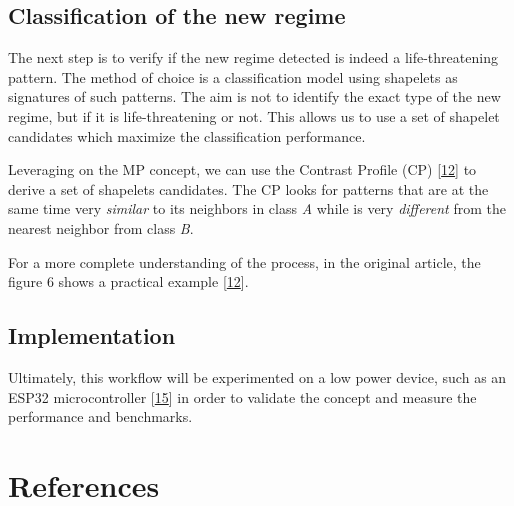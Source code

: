\documentclass[runningheads]{llncs}
\begin{document}
\hypertarget{classification-of-the-new-regime}{%
\subsection{Classification of the new regime}\label{classification-of-the-new-regime}}

The next step is to verify if the new regime detected is indeed a life-threatening pattern. The
method of choice is a classification model using shapelets as signatures of such patterns. The aim is
not to identify the exact type of the new regime, but if it is life-threatening or not. This allows
us to use a set of shapelet candidates which maximize the classification performance.

Leveraging on the MP concept, we can use the Contrast Profile (CP) {[}\protect\hyperlink{ref-Mercer2021}{12}{]} to derive a set of
shapelets candidates. The CP looks for patterns that are at the same time very \emph{similar} to its
neighbors in class \emph{A} while is very \emph{different} from the nearest neighbor from class \emph{B}.

For a more complete understanding of the process, in the original article, the figure 6 shows a
practical example {[}\protect\hyperlink{ref-Mercer2021}{12}{]}.

\hypertarget{implementation}{%
\subsection{Implementation}\label{implementation}}

Ultimately, this workflow will be experimented on a low power device, such as an ESP32 microcontroller {[}\protect\hyperlink{ref-esp32}{15}{]}
in order to validate the concept and measure the performance and benchmarks.

\hypertarget{references}{%
\section*{References}\label{references}}
\end{document}
